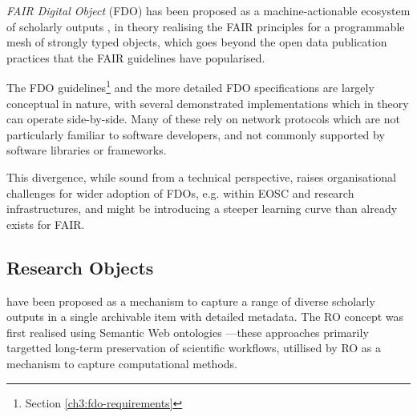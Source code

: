 






\emph{FAIR Digital Object} (\acrshort{FDO}) has been proposed as a machine-actionable ecosystem of scholarly outputs \cite{Schultes 2019}, in theory realising the \acrshort{FAIR} principles 
for a programmable mesh of strongly typed objects, which goes beyond the open data publication practices that the FAIR guidelines have popularised.

The FDO guidelines\footnote{Section \vref{ch3:fdo-requirements}} \cite{Anders 2023} and the more detailed FDO specifications \cite{Ivonne 2023} are largely conceptual in nature, with several demonstrated implementations \cite{Wittenburg 2022a,Lannom 2022a} which in theory can operate side-by-side. Many of these rely on network protocols \cite{Reilly 2009,Sun 2003a} which are not particularly familiar to software developers, and not commonly supported by software libraries or frameworks.

This divergence, while sound from a technical perspective, raises organisational challenges for wider adoption of FDOs, e.g. within EOSC and research infrastructures, and might be introducing a steeper learning curve than already exists for FAIR.



\subsection{Research Objects}





\cite{Bechhofer 2013} have been proposed as a mechanism to capture a range of diverse scholarly outputs in a single archivable item with detailed metadata. The RO concept was first realised using Semantic Web ontologies \cite{myExperiment 2009,Belhajjame 2015}---these approaches primarily targetted long-term preservation of \glspl{scientific workflow}, utillised by RO as a mechanism to capture computational methods.

